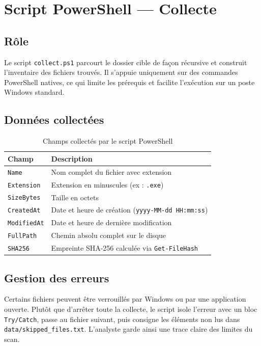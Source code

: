 \documentclass[12pt,a4paper]{article}
\begin{document}
\section{Script PowerShell — Collecte}

\subsection{Rôle}

Le script \texttt{collect.ps1} parcourt le dossier cible de façon récursive et construit l'inventaire des fichiers trouvés. Il s'appuie uniquement sur des commandes PowerShell natives, ce qui limite les prérequis et facilite l'exécution sur un poste Windows standard.

\subsection{Données collectées}

\begin{table}[h!]
  \centering
  \begin{tabularx}{\textwidth}{lX}
    \toprule
    \textbf{Champ} & \textbf{Description} \\
    \midrule
    \texttt{Name}       & Nom complet du fichier avec extension \\
    \texttt{Extension}  & Extension en minuscules (ex : \texttt{.exe}) \\
    \texttt{SizeBytes}  & Taille en octets \\
    \texttt{CreatedAt}  & Date et heure de création (\texttt{yyyy-MM-dd HH:mm:ss}) \\
    \texttt{ModifiedAt} & Date et heure de dernière modification \\
    \texttt{FullPath}   & Chemin absolu complet sur le disque \\
    \texttt{SHA256}     & Empreinte SHA-256 calculée via \texttt{Get-FileHash} \\
    \bottomrule
  \end{tabularx}
  \caption{Champs collectés par le script PowerShell}
\end{table}

\subsection{Gestion des erreurs}

Certains fichiers peuvent être verrouillés par Windows ou par une application ouverte. Plutôt que d'arrêter toute la collecte, le script isole l'erreur avec un bloc \texttt{Try/Catch}, passe au fichier suivant, puis consigne les éléments non lus dans \texttt{data/skipped\_files.txt}. L'analyste garde ainsi une trace claire des limites du scan.
\end{document}
